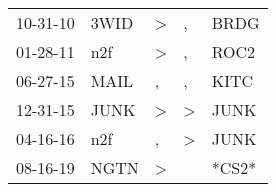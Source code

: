 \begin{supertabular}{lllll}
 10-31-10 &  3WID &  \textgreater &             , &   BRDG \\
 01-28-11 &   n2f &  \textgreater &             , &   ROC2 \\
 06-27-15 &  MAIL &             , &             , &   KITC \\
 12-31-15 &  JUNK &  \textgreater &  \textgreater &   JUNK \\
 04-16-16 &   n2f &             , &  \textgreater &   JUNK \\
 08-16-19 &  NGTN &  \textgreater &               &  *CS2* \\
\end{supertabular}
